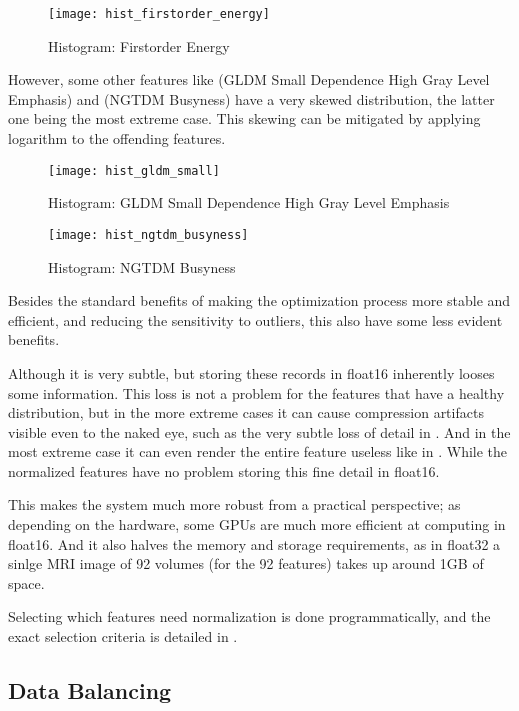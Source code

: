 \begin{figure}[H]
\centering
\texttt{[image: hist\_firstorder\_energy]}
\caption{Histogram: Firstorder Energy}
\label{fig:hist_fie}
\end{figure}

However, some other features like  (GLDM Small Dependence High Gray Level Emphasis) and  (NGTDM Busyness) have a very skewed distribution, the latter one being the most extreme case. This skewing can be mitigated by applying logarithm to the offending features.

\begin{figure}[H]
\centering
\texttt{[image: hist\_gldm\_small]}
\caption{Histogram: GLDM Small Dependence High Gray Level Emphasis}
\label{fig:hist_gls}
\end{figure}

\begin{figure}[H]
\centering
\texttt{[image: hist\_ngtdm\_busyness]}
\caption{Histogram: NGTDM Busyness}
\label{fig:hist_ngb}
\end{figure}

Besides the standard benefits of making the optimization process more stable and efficient, and reducing the sensitivity to outliers, this also have some less evident benefits.\par
Although it is very subtle, but storing these records in float16 inherently looses some information. This loss is not a problem for the features that have a healthy distribution, but in the more extreme cases it can cause compression artifacts visible even to the naked eye, such as the very subtle loss of detail in . And in the most extreme case it can even render the entire feature useless like in . While the normalized features have no problem storing this fine detail in float16.\par
This makes the system much more robust from a practical perspective; as depending on the hardware, some GPUs are much more efficient at computing in float16. And it also halves the memory and storage requirements, as in float32 a sinlge MRI image of 92 volumes (for the 92 features) takes up around 1GB of space.\par
Selecting which features need normalization is done programmatically, and the exact selection criteria is detailed in .

\subsection{Data Balancing}

